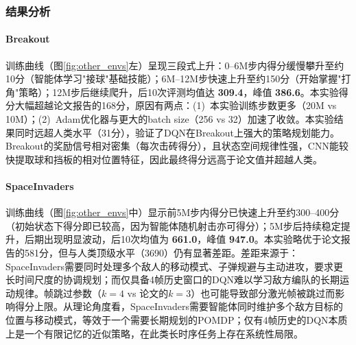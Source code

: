 \documentclass{article}
\begin{document}
\subsubsection{结果分析}

\paragraph{Breakout}

训练曲线（图\ref{fig:other_envs}左）呈现三段式上升：0--6M步内得分缓慢攀升至约10分（智能体学习"接球"基础技能）；6M--12M步快速上升至约150分（开始掌握"打角"策略）；12M步后继续爬升，后10次评测均值达 \textbf{309.4}，峰值 \textbf{386.6}。本实验得分大幅超越论文报告的168分，原因有两点：(1)~本实验训练步数更多（20M vs 10M）；(2)~Adam优化器与更大的batch size（256 vs 32）加速了收敛。本实验结果同时远超人类水平（31分），验证了DQN在Breakout上强大的策略规划能力。Breakout的奖励信号相对密集（每次击砖得分），且状态空间规律性强，CNN能较快提取球和挡板的相对位置特征，因此最终得分远高于论文值并超越人类。

\paragraph{SpaceInvaders}

训练曲线（图\ref{fig:other_envs}中）显示前5M步内得分已快速上升至约300--400分（初始状态下得分即已较高，因为智能体随机射击亦可得分）；5M步后持续稳定提升，后期出现明显波动，后10次均值为 \textbf{661.0}，峰值 \textbf{947.0}。本实验略优于论文报告的581分，但与人类顶级水平（3690）仍有显著差距。差距来源于：SpaceInvaders需要同时处理多个敌人的移动模式、子弹规避与主动进攻，要求更长时间尺度的协调规划；而仅具备4帧历史窗口的DQN难以学习敌方编队的长期运动规律。帧跳过参数（$k=4$ vs 论文的$k=3$）也可能导致部分激光帧被跳过而影响得分上限。从理论角度看，SpaceInvaders需要智能体同时维护多个敌方目标的位置与移动模式，等效于一个需要长期规划的POMDP；仅有4帧历史的DQN本质上是一个有限记忆的近似策略，在此类长时序任务上存在系统性局限。
\end{document}
